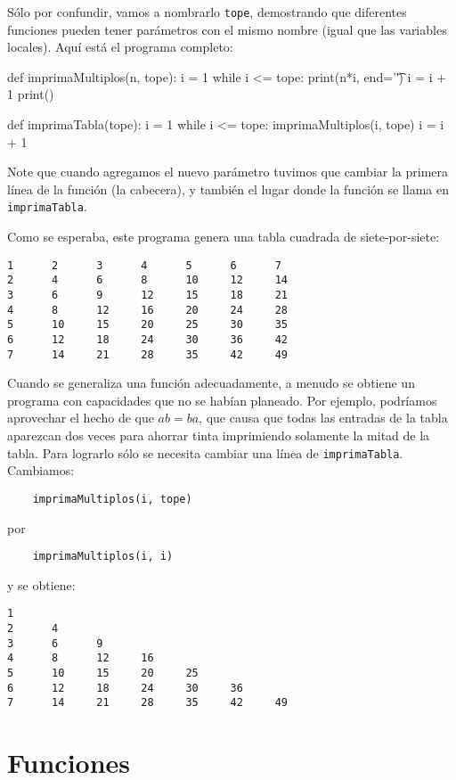 Sólo por confundir, vamos a nombrarlo \texttt{tope}, demostrando que
diferentes funciones pueden tener parámetros con el mismo nombre (igual
que las variables locales). Aquí está el programa completo:
\begin{pythoncode}
def imprimaMultiplos(n, tope):
  i = 1
  while i <= tope:
    print(n*i, end='\t')
    i = i + 1
  print()

def imprimaTabla(tope):
  i = 1
  while i <= tope:
    imprimaMultiplos(i, tope)
    i = i + 1
\end{pythoncode}

Note que cuando agregamos el nuevo parámetro tuvimos que cambiar la
primera línea de la función (la cabecera), y también el lugar donde
la función se llama en \texttt{imprimaTabla}.

Como se esperaba, este programa genera una tabla cuadrada de siete-por-siete:
\begin{verbatim}
1      2      3      4      5      6      7
2      4      6      8      10     12     14
3      6      9      12     15     18     21
4      8      12     16     20     24     28
5      10     15     20     25     30     35
6      12     18     24     30     36     42
7      14     21     28     35     42     49
\end{verbatim}
Cuando se generaliza una función adecuadamente, a menudo se obtiene
un programa con capacidades que no se habían planeado. Por ejemplo,
podríamos aprovechar el hecho de que $ab=ba$, que causa que todas
las entradas de la tabla aparezcan dos veces para ahorrar tinta imprimiendo
solamente la mitad de la tabla. Para lograrlo sólo se necesita cambiar
una línea de \texttt{imprimaTabla}. Cambiamos:
\begin{verbatim}
    imprimaMultiplos(i, tope)
\end{verbatim}
por
\begin{verbatim}
    imprimaMultiplos(i, i)
\end{verbatim}
y se obtiene:
\begin{verbatim}
1
2      4
3      6      9
4      8      12     16
5      10     15     20     25
6      12     18     24     30     36
7      14     21     28     35     42     49
\end{verbatim}

\section{Funciones}



